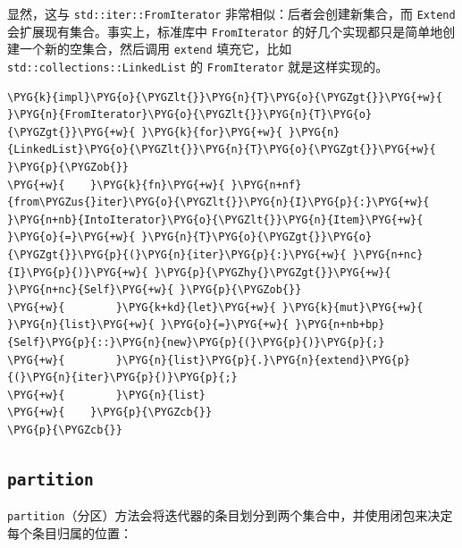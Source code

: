 显然，这与 \texttt{std::iter::FromIterator} 非常相似：后者会创建新集合，而 \texttt{Extend} 会扩展现有集合。事实上，标准库中 \texttt{FromIterator} 的好几个实现都只是简单地创建一个新的空集合，然后调用 \texttt{extend} 填充它，比如 \texttt{std::collections::LinkedList} 的 \texttt{FromIterator} 就是这样实现的。

\begin{Verbatim}[commandchars=\\\{\},breaklines=true,breakanywhere=true,fontsize=\codefont,xleftmargin=17bp]
\PYG{k}{impl}\PYG{o}{\PYGZlt{}}\PYG{n}{T}\PYG{o}{\PYGZgt{}}\PYG{+w}{ }\PYG{n}{FromIterator}\PYG{o}{\PYGZlt{}}\PYG{n}{T}\PYG{o}{\PYGZgt{}}\PYG{+w}{ }\PYG{k}{for}\PYG{+w}{ }\PYG{n}{LinkedList}\PYG{o}{\PYGZlt{}}\PYG{n}{T}\PYG{o}{\PYGZgt{}}\PYG{+w}{ }\PYG{p}{\PYGZob{}}
\PYG{+w}{    }\PYG{k}{fn}\PYG{+w}{ }\PYG{n+nf}{from\PYGZus{}iter}\PYG{o}{\PYGZlt{}}\PYG{n}{I}\PYG{p}{:}\PYG{+w}{ }\PYG{n+nb}{IntoIterator}\PYG{o}{\PYGZlt{}}\PYG{n}{Item}\PYG{+w}{ }\PYG{o}{=}\PYG{+w}{ }\PYG{n}{T}\PYG{o}{\PYGZgt{}}\PYG{o}{\PYGZgt{}}\PYG{p}{(}\PYG{n}{iter}\PYG{p}{:}\PYG{+w}{ }\PYG{n+nc}{I}\PYG{p}{)}\PYG{+w}{ }\PYG{p}{\PYGZhy{}\PYGZgt{}}\PYG{+w}{ }\PYG{n+nc}{Self}\PYG{+w}{ }\PYG{p}{\PYGZob{}}
\PYG{+w}{        }\PYG{k+kd}{let}\PYG{+w}{ }\PYG{k}{mut}\PYG{+w}{ }\PYG{n}{list}\PYG{+w}{ }\PYG{o}{=}\PYG{+w}{ }\PYG{n+nb+bp}{Self}\PYG{p}{::}\PYG{n}{new}\PYG{p}{(}\PYG{p}{)}\PYG{p}{;}
\PYG{+w}{        }\PYG{n}{list}\PYG{p}{.}\PYG{n}{extend}\PYG{p}{(}\PYG{n}{iter}\PYG{p}{)}\PYG{p}{;}
\PYG{+w}{        }\PYG{n}{list}
\PYG{+w}{    }\PYG{p}{\PYGZcb{}}
\PYG{p}{\PYGZcb{}}
\end{Verbatim}

\subsection{\texttt{partition}}

\texttt{partition}（分区）方法会将迭代器的条目划分到两个集合中，并使用闭包来决定每个条目归属的位置：

